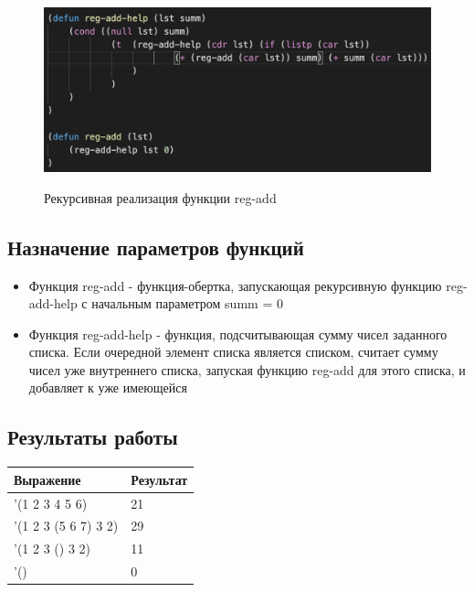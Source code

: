 \documentclass[a4paper,12pt]{article}
\begin{document}
 	\begin{figure}[h!]
 		\begin{center}
 			{\includegraphics[scale = 1.0]{6.8.png}}
 			\label{ris:6.8}
 		\end{center}
 	\caption{Рекурсивная реализация функции reg-add}
 	\end{figure}
 	
 	\subsection*{Назначение параметров функций}
 	
 	\begin{itemize}
 		\item Функция reg-add - функция-обертка, запускающая рекурсивную функцию reg-add-help с начальным параметром summ = 0
 		\item Функция reg-add-help - функция, подсчитывающая сумму чисел заданного списка. Если очередной элемент списка является списком, считает сумму чисел уже внутреннего списка, запуская функцию reg-add для этого списка, и добавляет к уже имеющейся
 	\end{itemize}
 	
 	\subsection*{Результаты работы}
 	
 	 	 	\begin{table} [h!]
 		\begin{center}
 			\begin{tabular}{|l|l|}
 				\hline
 				{\bf  Выражение} & {\bf Результат} \\
 				\hline
 				{'(1 2 3 4 5 6)} & 21\\
 				\hline
 				{'(1 2 3 (5 6 7) 3 2)} & 29\\
 				\hline
 				{'(1 2 3 () 3 2)} & 11 \\
 				\hline
 				{'()} & 0\\
 				\hline
 			\end{tabular}  
 			\label{m2}
 		\end{center}
 	\end{table}
 	
\end{document}
